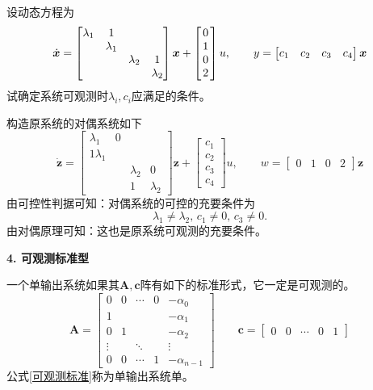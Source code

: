 \examples 设动态方程为
\begin{equation*}
	\dot{\bm{x}} = 
	\begin{bmatrix}
		\lambda_1 & 1 & & \\
		& \lambda_1 & & \\
		& & \lambda_2 & 1\\
		&&& \lambda_2 
	\end{bmatrix}
	\bm{x}
	+ 
	\begin{bmatrix}
		0\\
		\hspace*{0.5mm} 1 \hspace*{0.5mm}\\
		0\\
		2
	\end{bmatrix}
	u,
	\qquad y = 
	\begin{bmatrix}
		c_1 & c_2 & c_3 & c_4
	\end{bmatrix}
	\bm{x}
\end{equation*}
试确定系统可观测时$\lambda_i,c_i$应满足的条件。

\solve 构造原系统的对偶系统如下
\begin{equation*}
	\dot{\bm{z}} = 
	\begin{bmatrix}
		\lambda_1 & 0 &&\\
		1 \lambda_1 & &\\
		&& \lambda_2 & 0\\
		&& 1 &\lambda_2
	\end{bmatrix}
	\bm{z}
	+
	\begin{bmatrix}
		c_1 \\
		c_2 \\
		c_3 \\
		c_4
	\end{bmatrix}
	u,
	\qquad w = 
	\begin{bmatrix}
		0 & 1 & 0 & 2
	\end{bmatrix}
	\bm{z}
\end{equation*}
由可控性判据可知：对偶系统的可控的充要条件为
\begin{equation*}
	\lambda_1 \neq \lambda_2 ,\, c_1 \neq 0,\, c_3 \neq 0.
\end{equation*}
由对偶原理可知：这也是原系统可观测的充要条件。
\clearpage

\noindent \textbf{4. 可观测标准型}

一个单输出系统如果其$\bm{A,c}$阵有如下的标准形式，它一定是可观测的。
\begin{equation}
	\bm{A} = 
	\begin{bmatrix}
		0 & 0 & \cdots & 0 &  -\alpha_0\\
		1 &&&&-\alpha_1 \\
		0 & 1 & & & - \alpha_2\\
		\vdots &  & \ddots & & \vdots\\
		0 & 0 & \cdots & 1 & -\alpha_{n-1}
	\end{bmatrix}
	\qquad 
	\bm{c} = 
	\begin{bmatrix}
		0 & 0& \cdots & 0 &1
	\end{bmatrix}
	\label{可观测标准}
\end{equation}
公式\eqref{可观测标准}称为单输出系统单。
\vspace*{0.5em}


